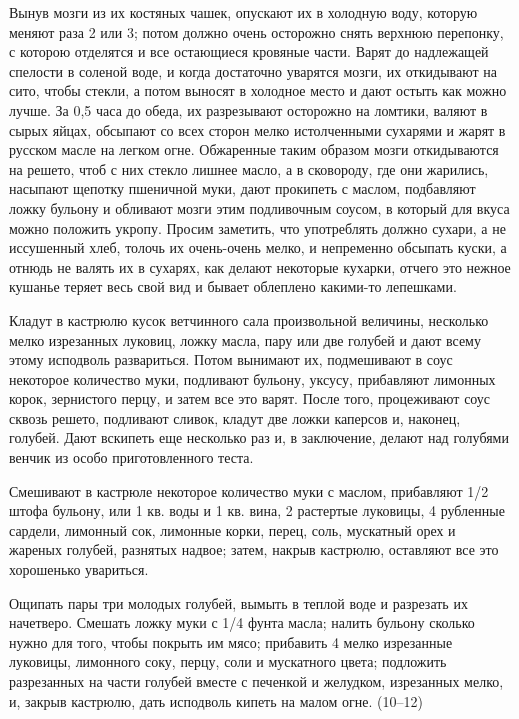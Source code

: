Вынув мозги из их костяных чашек, опускают их в холодную воду, которую меняют раза 2 или 3; потом должно очень осторожно снять верхнюю перепонку, с которою отделятся и все остающиеся кровяные части. Варят до надлежащей спелости в соленой воде, и когда достаточно уварятся мозги, их откидывают на сито, чтобы стекли, а потом выносят в холодное место и дают остыть как можно лучше. За 0,5 часа до обеда, их разрезывают осторожно на ломтики, валяют в сырых яйцах, обсыпают со всех сторон мелко истолченными сухарями и жарят в русском масле на легком огне. Обжаренные таким образом мозги откидываются на решето, чтоб с них стекло лишнее масло, а в сковороду, где они жарились, насыпают щепотку пшеничной муки, дают прокипеть с маслом, подбавляют ложку бульону и обливают мозги этим подливочным соусом, в который для вкуса можно положить укропу. Просим заметить, что употреблять должно сухари, а не иссушенный хлеб, толочь их очень-очень мелко, и непременно обсыпать куски, а отнюдь не валять их в сухарях, как делают некоторые кухарки, отчего это нежное кушанье теряет весь свой вид и бывает облеплено какими-то лепешками.


Кладут в кастрюлю кусок ветчинного сала произвольной величины, несколько мелко изрезанных луковиц, ложку масла, пару или две голубей и дают всему этому исподволь развариться. Потом вынимают их, подмешивают в соус некоторое количество муки, подливают бульону, уксусу, прибавляют лимонных корок, зернистого перцу, и затем все это варят. После того, процеживают соус сквозь решето, подливают сливок, кладут две ложки каперсов и, наконец, голубей. Дают вскипеть еще несколько раз и, в заключение, делают над голубями венчик из особо приготовленного теста. 


Смешивают в кастрюле некоторое количество муки с маслом, прибавляют 1/2 штофа бульону, или 1 кв. воды и 1 кв. вина, 2 растертые луковицы, 4 рубленные сардели, лимонный сок, лимонные корки, перец, соль, мускатный орех и жареных голубей, разнятых надвое; затем, накрыв кастрюлю, оставляют все это хорошенько увариться.


Ощипать пары три молодых голубей, вымыть в теплой воде и разрезать их начетверо. Смешать ложку муки с 1/4 фунта масла; налить бульону сколько нужно для того, чтобы покрыть им мясо; прибавить 4 мелко изрезанные луковицы, лимонного соку, перцу, соли и мускатного цвета; подложить разрезанных на части голубей вместе с печенкой и желудком, изрезанных мелко, и, закрыв кастрюлю, дать исподволь кипеть на малом огне. (10--12) 

